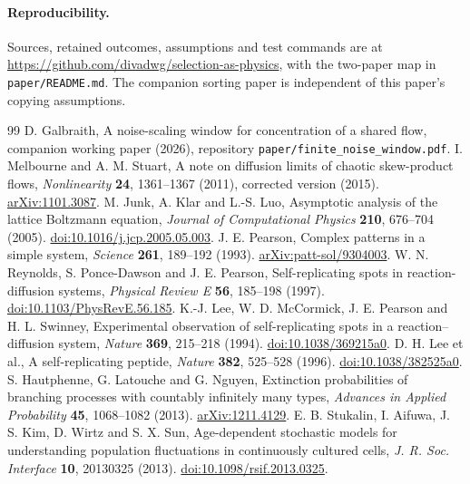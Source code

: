 \documentclass[11pt,a4paper]{article}
\begin{document}
\paragraph{Reproducibility.}
Sources, retained outcomes, assumptions and test commands are at
\url{https://github.com/divadwg/selection-as-physics}, with the two-paper map in
\texttt{paper/README.md}. The companion sorting paper is independent of this
paper's copying assumptions.

\begin{thebibliography}{99}
 D. Galbraith, A noise-scaling window for concentration of a shared flow,
companion working paper (2026), repository \texttt{paper/finite\_noise\_window.pdf}.
 I. Melbourne and A. M. Stuart, A note on diffusion limits of chaotic
skew-product flows, \emph{Nonlinearity} \textbf{24}, 1361--1367 (2011), corrected version (2015).
\href{https://arxiv.org/abs/1101.3087}{arXiv:1101.3087}.
 M. Junk, A. Klar and L.-S. Luo, Asymptotic analysis of the lattice Boltzmann equation,
\emph{Journal of Computational Physics} \textbf{210}, 676--704 (2005).
\href{https://doi.org/10.1016/j.jcp.2005.05.003}{doi:10.1016/j.jcp.2005.05.003}.
 J. E. Pearson, Complex patterns in a simple system,
\emph{Science} \textbf{261}, 189--192 (1993).
\href{https://arxiv.org/abs/patt-sol/9304003}{arXiv:patt-sol/9304003}.
 W. N. Reynolds, S. Ponce-Dawson and J. E. Pearson,
Self-replicating spots in reaction-diffusion systems,
\emph{Physical Review E} \textbf{56}, 185--198 (1997).
\href{https://doi.org/10.1103/PhysRevE.56.185}{doi:10.1103/PhysRevE.56.185}.
 K.-J. Lee, W. D. McCormick, J. E. Pearson and H. L. Swinney,
Experimental observation of self-replicating spots in a reaction--diffusion system,
\emph{Nature} \textbf{369}, 215--218 (1994).
\href{https://doi.org/10.1038/369215a0}{doi:10.1038/369215a0}.
 D. H. Lee et al., A self-replicating peptide,
\emph{Nature} \textbf{382}, 525--528 (1996).
\href{https://doi.org/10.1038/382525a0}{doi:10.1038/382525a0}.
 S. Hautphenne, G. Latouche and G. Nguyen,
Extinction probabilities of branching processes with countably infinitely many types,
\emph{Advances in Applied Probability} \textbf{45}, 1068--1082 (2013).
\href{https://arxiv.org/abs/1211.4129}{arXiv:1211.4129}.
 E. B. Stukalin, I. Aifuwa, J. S. Kim, D. Wirtz and S. X. Sun,
Age-dependent stochastic models for understanding population fluctuations in
continuously cultured cells, \emph{J. R. Soc. Interface} \textbf{10}, 20130325 (2013).
\href{https://doi.org/10.1098/rsif.2013.0325}{doi:10.1098/rsif.2013.0325}.
\end{thebibliography}
\end{document}
